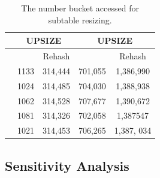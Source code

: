 
\begin{table}
	\centering
	\caption{The number bucket accessed for subtable resizing.}
	\vspace{-1em}
	\begin{tabular}{|c|c|c|c|c|}
		\hline  
		& \multicolumn{2}{c|}{UPSIZE} & \multicolumn{2}{c|}{UPSIZE} \\ \hline
		& \voter & Rehash & \voter & Rehash \\ \hline
		\dstwitter & 1133 & 314,444 & 701,055 & 1,386,990 \\ \hline
		\dsreddit & 1024 & 314,485 & 704,030 & 1,388,938 \\ \hline
		\dstpch& 1062 & 314,528 & 707,677 & 1,390,672\\ \hline
		\dsali& 1081 & 314,326 & 702,058 & 1,387547 \\ \hline
		\dsrandom& 1021 & 314,453& 706,265& 1,387, 034\\ \hline
	\end{tabular}
\end{table}

\subsection{Sensitivity Analysis}\label{sec:exp:tune}


